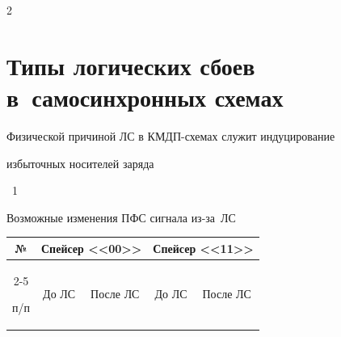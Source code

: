 \begin{multicols}{2}
\begin{figure}[b]
\begin{center}
\end{center}

\vspace*{-11pt}


\end{figure}

   

   

   \vspace*{-4pt}

   



\section{Типы логических сбоев в~самосинхронных схемах}



      \vspace*{-4pt}



  Физической причиной ЛС в КМДП-схе\-мах служит индуцирование 

избыточных носителей заряда\linebreak\vspace*{-12pt}



\pagebreak




\begin{center}



\parbox{73mm}{{{\tablename~1}\ \ \small{

Возможные изменения ПФС сигнала из-за~ЛС

}}}





\vspace*{2ex}



{\small \begin{tabular}{|c|c|c|c|c|}

\hline

№ 

&\multicolumn{2}{c|}{Спейсер <<00>>}&\multicolumn{2}{c|}{Спейсер <<11>>}\\

\cline{2-5}

п/п&До ЛС&После ЛС&До ЛС&После ЛС\\


\end{tabular}}
\end{center}
\end{multicols}
